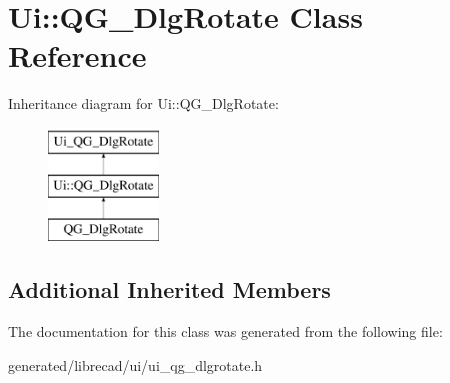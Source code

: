 \hypertarget{classUi_1_1QG__DlgRotate}{\section{Ui\-:\-:Q\-G\-\_\-\-Dlg\-Rotate Class Reference}
\label{classUi_1_1QG__DlgRotate}
}
Inheritance diagram for Ui\-:\-:Q\-G\-\_\-\-Dlg\-Rotate\-:\begin{figure}[H]
\begin{center}
\leavevmode
\includegraphics[height=3.000000cm]{classUi_1_1QG__DlgRotate}
\end{center}
\end{figure}
\subsection*{Additional Inherited Members}


The documentation for this class was generated from the following file\-:\begin{DoxyCompactItemize}
\item 
generated/librecad/ui/ui\-\_\-qg\-\_\-dlgrotate.\-h\end{DoxyCompactItemize}
